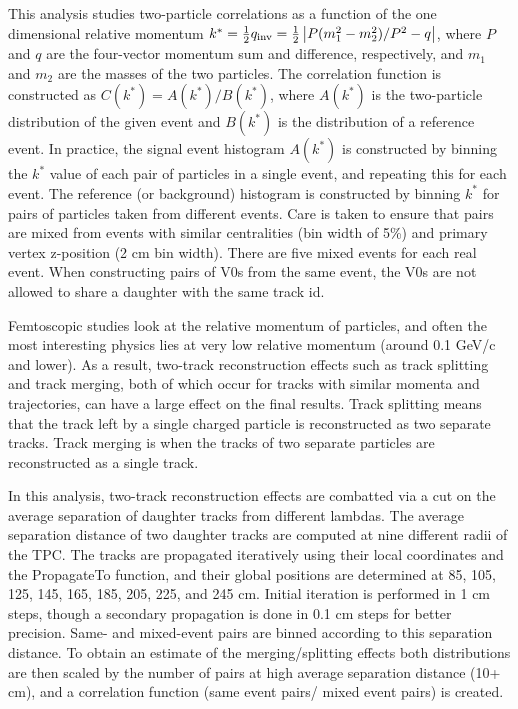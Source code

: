 This analysis studies two-particle correlations as a function of the one dimensional relative momentum $k^*=\frac{1}{2}q_{\mathrm{inv}}=\frac{1}{2}\left\lvert P(m^2_1-m^2_2)/P^2 - q\right\rvert$, where $P$ and $q$ are the four-vector momentum sum and difference, respectively, and $m_1$ and $m_2$ are the masses of the two particles.  The correlation function is constructed as $C(k^*) = A(k^*)/B(k^*)$, where $A(k^*)$ is the two-particle distribution of the given event and $B(k^*)$ is the distribution of a reference event.  In practice, the signal event histogram $A(k^*)$ is constructed by binning the $k^*$ value of each pair of particles in a single event, and repeating this for each event.  The reference (or background) histogram is constructed by binning $k^*$ for pairs of particles taken from different events.  Care is taken to ensure that pairs are mixed from events with similar centralities (bin width of 5\%) and primary vertex z-position (2 cm bin width).  There are five mixed events for each real event.  When constructing pairs of V0s from the same event, the V0s are not allowed to share a daughter with the same track id. 

Femtoscopic studies look at the relative momentum of particles, and often the most interesting physics lies at very low relative momentum (around 0.1 GeV/c and lower).  As a result, two-track reconstruction effects such as track splitting and track merging, both of which occur for tracks with similar momenta and trajectories, can have a large effect on the final results.  Track splitting means that the track left by a single charged particle is reconstructed as two separate tracks. Track merging is when the tracks of two separate particles are reconstructed as a single track.  

In this analysis, two-track reconstruction effects are combatted via a cut on the average separation of daughter tracks from different lambdas.  The average separation distance of two daughter tracks are computed at nine different radii of the TPC.  The tracks are propagated iteratively using their local coordinates and the PropagateTo function, and their global positions are determined at 85, 105, 125, 145, 165, 185, 205, 225, and 245 cm.  Initial iteration is performed in 1 cm steps, though a secondary propagation is done in 0.1 cm steps for better precision.  Same- and mixed-event pairs are binned according to this separation distance.  To obtain an estimate of the merging/splitting effects both distributions are then scaled by the number of pairs at high average separation distance (10+ cm), and a correlation function (same event pairs/ mixed event pairs) is created. 

